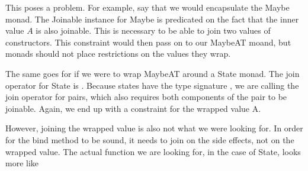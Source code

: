 This poses a problem. For example, say that we would encapsulate the Maybe
monad. The Joinable instance for Maybe is predicated on the fact that the inner
value $A$ is also joinable. This is necessary to be able to join two values of
 constructors. This constraint would then pass on to our MaybeAT
moand, but monads should not place restrictions on the values they wrap.

The same goes for if we were to wrap MaybeAT around a State monad. The join
operator for State is 
.
Because states have the type signature , we are calling the
join operator for pairs, which also requires both components of the pair to be
joinable. Again, we end up with a constraint for the wrapped value A.

However, joining the wrapped value is also not what we were looking for. In
order for the bind method to be sound, it needs to join on the side effects,
not on the wrapped value. The actual function we are looking for, in the case
of State, looks more like 
